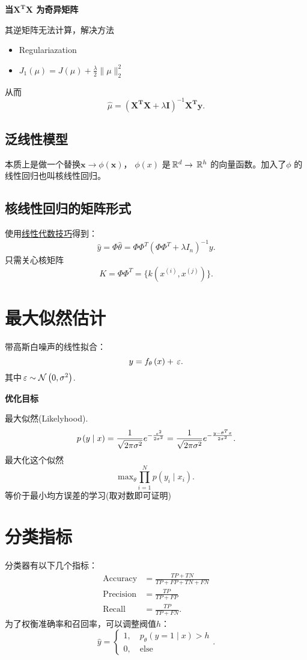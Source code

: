 \noindent \textbf{当$\bm{X^{T}X}$ 为奇异矩阵 }

其逆矩阵无法计算，解决方法
\begin{itemize}
		\item Regulariazation
		\item $J_1\left( \mu \right)  = J\left( \mu \right) + \frac{\lambda}{2} \|\mu\|^2_{2}  $
\end{itemize}
从而
\[
		\hat{\mu}=  \left( \bm{X^{T}X } + \lambda \bm{I} \right) ^{-1} \bm{X^{T} y}
.\] 
\subsection{泛线性模型}
本质上是做一个替换$ \bm x\to \phi\left( \bm x \right) $，
$\phi\left( x \right) $ 是$\,\mathbb{R}^{d}\to\,\mathbb{R}^{h}$
的向量函数。加入了$\phi$ 的线性回归也叫核线性回归。

\subsection{核线性回归的矩阵形式}
使用\href{https://zhuanlan.zhihu.com/p/45223109}{线性代数技巧}得到：
\[
		\hat{y} = \Phi \hat{\theta} = \Phi\Phi^{T} \left( \Phi\Phi^{T} + \lambda I_{n} \right) ^{-1} y 
.\]  
只需关心核矩阵
\[
		K = \Phi\Phi^{T} = \{ k\left( x^{(i)}, x^{(j)} \right) \} 
.\] 

\section{最大似然估计}

带高斯白噪声的线性拟合：
\[
		y = f_{\theta} \left( x \right)  + \,\varepsilon
.\] 
其中$\,\varepsilon \sim \mathcal{N} \left( 0, \sigma^2 \right) $.

\noindent \textbf{优化目标}

最大似然(Likelyhood). 
\[
		p\left( y \mid x \right) =\frac{1}{\sqrt{2\pi \sigma^2} } e^{- \frac{\,\varepsilon^2}{2\sigma^2}   }= \frac{1}{\sqrt{2\pi \sigma^2} } e^{- \frac{y-\theta^{T}x }{2\sigma^2}   }
.\] 
最大化这个似然
\[
		\mathrm{max}_{\theta} \prod_{i=1}^{N} p\left( y_{i}  \mid  x_{i} \right)  
.\] 
等价于最小均方误差的学习(取对数即可证明)

\section{分类指标}
分类器有以下几个指标：
\begin{align*}
		\mathrm{Accuracy}  &= \frac{TP + TN}{TP + FP + TN + FN} \\
		\mathrm{Precision}  &=  \frac{TP}{TP+FP} \\
		\mathrm{Recall}  &=  \frac{TP}{TP+FN} 
.\end{align*} 
为了权衡准确率和召回率，可以调整阀值$h$：
\[
\hat{y} = \begin{cases}
		1, \quad p_{\theta}\left( y=1 \mid x \right) > h \\
		0, \quad \text{else}
\end{cases}
.\] 

